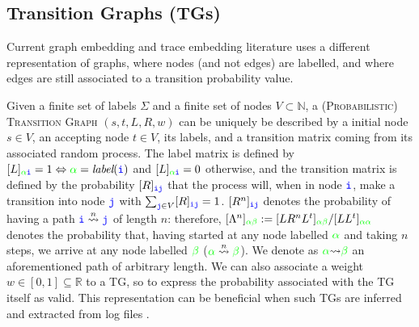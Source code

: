 \subsection{Transition Graphs (TGs)}\label{subsec:ppn}
Current graph embedding and trace embedding literature uses a different representation of graphs, where nodes (and not edges) are labelled, and where edges are still associated to a transition probability value.

Given a finite set of labels $\Sigma$ and a finite set of nodes $V\subset \mathbb{N}$,  a \textsc{(Probabilistic) Transition Graph} $(s,t,L,R,w)$ \cite{GartnerFW03} can be uniquely be described by a initial node $s\in V$, an accepting node $t\in V$, its labels, and a transition matrix coming from its associated random process. The label matrix is defined by $[L]_{{\color{green}\alpha}\texttt{\color{blue}i}}=1\Leftrightarrow {\color{green}\alpha}=\textit{label}(\texttt{\color{blue}i})$ and $[L]_{{\color{green}\alpha}\texttt{\color{blue}i}}=0$ otherwise, and the transition matrix is defined by the probability $[R]_{\texttt{\color{blue}ij}}$ that the process will, when in node $\texttt{\color{blue}i}$, make a transition into node $\texttt{\color{blue}j}$ \cite{Prob} with $\sum_{\texttt{\color{blue}j}\in V}[R]_{\color{blue}\texttt{ij}}=1$. $[R^n]_{\texttt{\color{blue}ij}}$ denotes the probability of having a path $\texttt{\color{blue}i}\overset{n}{\rightsquigarrow}\texttt{\color{blue}j}$ of length $n$: therefore, $[\Lambda^n]_{\color{green}\alpha\beta}:=[LR^nL^t]_{\color{green}\alpha\beta}/[LL^t]_{\color{green}\alpha\alpha}$ denotes the probability that, having started at any node labelled $\color{green}\alpha$ and taking $n$ steps, we arrive at any node labelled $\color{green}\beta$ (${\color{green}\alpha}\overset{n}{\rightsquigarrow}{\color{green}\beta}$). We denote as ${\color{green}\alpha}{\rightsquigarrow}{\color{green}\beta}$ an aforementioned path of arbitrary length. 
We can also associate a weight $w\in[0,1]\subseteq\mathbb{R}$ to a TG, so to express the probability associated with the TG itself as valid. This representation can be beneficial when such TGs are inferred and extracted from log files \cite{PPNFromLog}.

